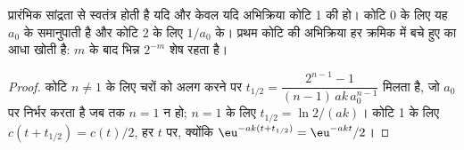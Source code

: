 \begin{proposition}[अर्ध-आयु परीक्षण]\label{prop:b1:rate-laws:half-life-test}
 प्रारंभिक सांद्रता से स्वतंत्र होती है यदि और केवल यदि
अभिक्रिया कोटि 1 की हो। कोटि 0 के लिए यह $a_0$ के समानुपाती है और
कोटि 2 के लिए $1/a_0$ के। प्रथम कोटि की अभिक्रिया हर क्रमिक  में
बचे हुए का आधा खोती है: $m$  के बाद भिन्न $2^{-m}$
शेष रहता है।
\end{proposition}

\begin{proof}
कोटि $n \ne 1$ के लिए चरों को अलग करने पर $t_{1/2} = \dfrac{2^{n-1} -
1}{(n-1)\,ak\,a_0^{n-1}}$ मिलता है, जो $a_0$ पर निर्भर करता है जब तक $n = 1$ न हो;
$n = 1$ के लिए $t_{1/2} = \ln2/(ak)$। कोटि 1 के लिए $c(t + t_{1/2}) = c(t)/2$, हर $t$ पर,
क्योंकि $\eu^{-ak(t + t_{1/2})} = \eu^{-akt}/2$।
\end{proof}

